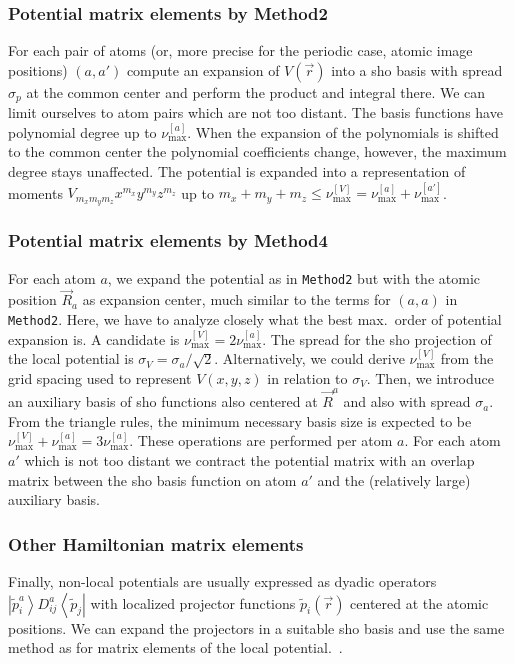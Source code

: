 \documentclass[oribibl]{llncs}
\newcommand{\um}[1]{_{\mathrm{#1}}}
\newcommand{\ttt}[1]{\texttt{#1}}
\newcommand{\ket}[1]{\left| #1 \right\rangle}
\newcommand{\bra}[1]{\left\langle #1 \right|}
\newcommand{\numax}{\nu\um{max}}
\begin{document}
\subsubsection{Potential matrix elements by Method2}
For each pair of atoms 
(or, more precise for the periodic case, atomic image positions)
$(a,a')$ compute an expansion of $V(\vec r)$ into a \ac{sho} basis with spread $\sigma_p$
at the common center and perform the product and integral there.
We can limit ourselves to atom pairs which are not too distant.
The basis functions have polynomial degree up to $\numax^{[a]}$.
When the expansion of the polynomials is shifted to the common center
the polynomial coefficients change, however, the maximum degree stays unaffected.
The potential is expanded into a representation of moments $V_{m_x m_y m_z} x^{m_x} y^{m_y} z^{m_z}$ up to $m_x + m_y + m_z \leq \numax^{[V]} = \numax^{[a]} + \numax^{[a']}$.


\subsubsection{Potential matrix elements by Method4}
For each atom $a$, we expand the potential as in \ttt{Method2} but with the
atomic position $\vec R_a$ as expansion center, much similar to
the terms for $(a, a)$ in \ttt{Method2}.
Here, we have to analyze closely what the best max.~order of potential expansion is.
A candidate is $\numax^{[V]} = 2\numax^{[a]}$.
The spread for the \ac{sho} projection of the local potential
is $\sigma_V = \sigma_a/\sqrt{2}$.
Alternatively, we could derive $\numax^{[V]}$ from the grid spacing used to represent $V(x,y,z)$ in relation to $\sigma_V$.
Then, we introduce an auxiliary basis of \ac{sho} functions
also centered at $\vec R^a$ and also with spread $\sigma_a$.
From the triangle rules, the minimum necessary basis size
is expected to be $\numax^{[V]} + \numax^{[a]} = 3\numax^{[a]}$.
These operations are performed per atom $a$.
For each atom $a'$ which is not too distant
we contract the potential matrix with an overlap matrix between
the \ac{sho} basis function on atom $a'$ and the (relatively large) auxiliary basis.


\subsubsection{Other Hamiltonian matrix elements}
Finally, non-local potentials are usually expressed as dyadic operators
$\ket{\tilde p^a_i} D^a_{ij} \bra{\tilde p_j}$ with localized projector functions $\tilde p_i(\vec r)$
centered at the atomic positions.
We can expand the projectors in a suitable \ac{sho} basis and use the same method
as for matrix elements of the local potential.~\cite{BaumeisterTsukamotoPASC19}.
\end{document}
